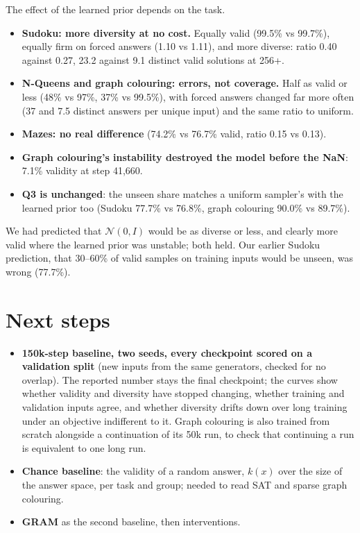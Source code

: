 \documentclass[11pt]{article}
\begin{document}
The effect of the learned prior depends on the task.
\begin{itemize}
  \item \textbf{Sudoku: more diversity at no cost.} Equally valid (99.5\% vs 99.7\%), equally firm on forced answers
  (1.10 vs 1.11), and more diverse: ratio 0.40 against 0.27, 23.2 against 9.1 distinct valid solutions at 256+.
  \item \textbf{N-Queens and graph colouring: errors, not coverage.} Half as valid or less (48\% vs 97\%, 37\% vs
  99.5\%), with forced answers changed far more often (37 and 7.5 distinct answers per unique input) and the same
  ratio to uniform.
  \item \textbf{Mazes: no real difference} (74.2\% vs 76.7\% valid, ratio 0.15 vs 0.13).
  \item \textbf{Graph colouring's instability destroyed the model before the NaN}: 7.1\% validity at step 41{,}660.
  \item \textbf{Q3 is unchanged}: the unseen share matches a uniform sampler's with the learned prior too (Sudoku
  77.7\% vs 76.8\%, graph colouring 90.0\% vs 89.7\%).
\end{itemize}
We had predicted that $\mathcal{N}(0,I)$ would be as diverse or less, and clearly more valid where the learned prior
was unstable; both held. Our earlier Sudoku prediction, that 30--60\% of valid samples on training inputs would be
unseen, was wrong (77.7\%).

\section{Next steps}
\label{sec:next}

\begin{itemize}
  \item \textbf{150k-step baseline, two seeds, every checkpoint scored on a validation split} (new inputs from the same
  generators, checked for no overlap). The reported number stays the final checkpoint; the curves show whether
  validity and diversity have stopped changing, whether training and validation inputs agree, and whether diversity
  drifts down over long training under an objective indifferent to it. Graph colouring is also trained from scratch
  alongside a continuation of its 50k run, to check that continuing a run is equivalent to one long run.
  \item \textbf{Chance baseline}: the validity of a random answer, $k(x)$ over the size of the answer space, per task
  and group; needed to read SAT and sparse graph colouring.
  \item \textbf{GRAM} as the second baseline, then interventions.
\end{itemize}
\end{document}
